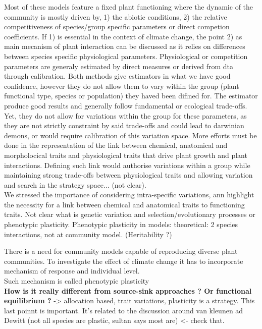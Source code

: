 \documentclass[review]{elsarticle}
\begin{document}
Most of these models feature a fixed plant functioning where the dynamic of the community is mostly driven by, 1) the abiotic conditions, 2) the relative competitiveness of species/group specific parameters or direct competion coefficients. If 1) is essential in the context of climate change, the point 2) as main mecanism of plant interaction can be discussed as it relies on differences between species specific physiological parameters. Physiological or competition parameters are generaly estimated by direct measures or derived from dta through calibration. Both methods give estimators in what we have good confidence, however they do not allow them to vary within the group (plant functional type, species or population) they haved been difined for. The estimator produce good results and generally follow fundamental or ecological trade-offs. Yet, they do not allow for variations within the group for these parameters, as they are not strictly constraint by said trade-offs and could lead to darwinian demons, or would require calibration of this variation space. More efforts must be done in the representation of the link  between chemical, anatomical and morpholocical traits and physiological traits that drive plant growth and plant interactions. Defining such link would authorise variations within a group while maintaining strong trade-offs between physiological traits and allowing variation and search in the strategy space... (not clear).\\

We stressed the importance of considering intra-specific variations, ann highlight the necessity for a link between chemical and anatomical traits to functioning traits.  
 Not clear what is genetic variation and selection/evolutionary processes or phenotypic plasticity. Phenotypic plasticity in models: theoretical: 2 species interactions, not at community model. (Heritability ?)




There is a need for community models capable of reproducing diverse plant communities. To investigate the effect of climate change it has to incorporate mechanism of response and individual level.\\
Such mechanism is called phenotypic plasticity\\

\textbf{
How is it really different from source-sink approaches ? Or functional equilibrium ?}
-> allocation based, trait variations, plasticity is a strategy. This last poinnt is important. It's related to the discussion around van kleunen ad Dewitt (not all species are plastic, sultan says most are) <- check that.
\end{document}
